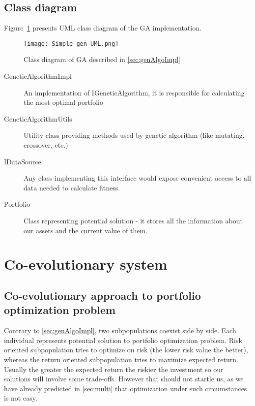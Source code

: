 \subsection{Class diagram}
\label{gen-class-diagram}

Figure~\ref{fig:GA_diag} presents UML class diagram of the GA implementation.

\begin{figure}[ht]   
	    \begin{center}
	      \texttt{[image: Simple\_gen\_UML.png]}
	    \end{center}
	    \caption{Class diagram of GA described in \ref{sec:genAlgoImpl}} 
	    \label{fig:GA_diag}
	  \end{figure}

\begin{description}
  \item [GeneticAlgorithmImpl]
    An implementation of IGeneticAlgorithm, it is responsible for calculating the most optimal portfolio
  \item [GeneticAlgorithmUtils]
    Utility class providing methods used by genetic algorithm (like mutating, crossover, etc.)
  \item [IDataSource]
    Any class implementing this interface would expose convenient access to all data needed to calculate fitness.
  \item [Portfolio]
    Class representing potential solution - it stores all the information about our assets and the current value of them.

\end{description}

\section{Co-evolutionary system}
\label{sec:co-evol-sys}

\subsection{Co-evolutionary approach to portfolio optimization problem}

Contrary to \ref{sec:genAlgoImpl}, two subpopulations coexist side by side.
Each individual represents potential solution to portfolio optimization problem.
Risk oriented subpopulation tries to optimize on risk (the lower risk value the better), whereas the return oriented subpopulation tries to maximize expected return.
Usually the greater the expected return the riskier the investment so our solutions will involve some trade-offs.
However that should not startle us, as we have already predicted in \ref{sec:multi} that optimization under such circumstances is not easy.

